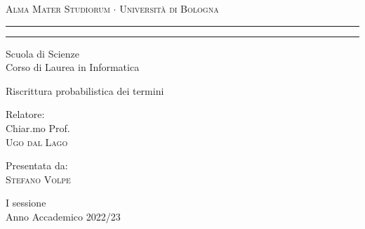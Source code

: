 \begin{titlepage}
	\begin{center}
		{{\Large{\textsc{Alma Mater Studiorum $\cdot$ Universit\`a di
							Bologna}}}} \rule[0.1cm]{15.8cm}{0.1mm}
		\rule[0.5cm]{15.8cm}{0.6mm}
		{\small{Scuola di Scienze \\
				Corso di Laurea in Informatica }}
	\end{center}
	\vspace{15mm}
	\begin{center}
		{\LARGE{Riscrittura probabilistica dei termini}}\\
	\end{center}
	\vspace{40mm}
	\par
	\noindent
	\begin{minipage}[t]{0.47\textwidth}
		{\large{Relatore:\\
				Chiar.mo Prof.\\
				\textsc{Ugo dal Lago}}}
	\end{minipage}
	\hfill
	\begin{minipage}[t]{0.47\textwidth}\raggedleft
		{\large{Presentata da:\\
				\textsc{Stefano Volpe}}}
	\end{minipage}
	\vspace{20mm}
	\begin{center}
		{\large{\RN{1} sessione\\
				Anno Accademico 2022/23}}
	\end{center}
\end{titlepage}

\newpage
\null
\thispagestyle{empty}
\newpage
